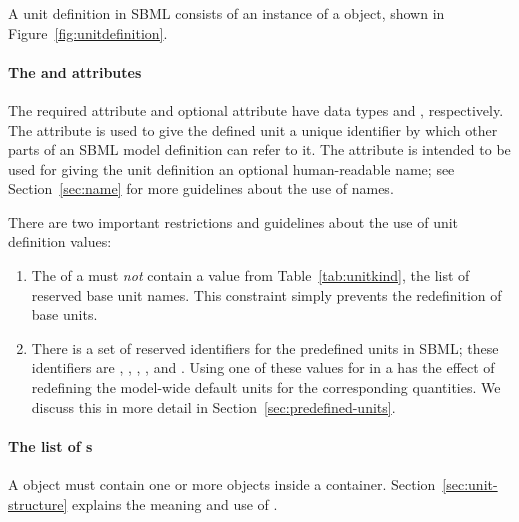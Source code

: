 \subsubsection{}
\label{sec:unitdefinition-structure}

A unit definition in SBML consists of an instance of a
\UnitDefinition object, shown in Figure~\ref{fig:unitdefinition}.


\paragraph{The  and  attributes}

The required attribute  and optional attribute  have
data types  and , respectively.
The  attribute is used to give the defined unit a unique
identifier by which other parts of an SBML model definition can
refer to it.  The  attribute is intended to be used for
giving the unit definition an optional human-readable name; see
Section~\ref{sec:name} for more guidelines about the use of names.

There are two important restrictions and guidelines about the use
of unit definition  values:
\begin{enumerate}
  
\item The  of a \UnitDefinition must \emph{not} contain
  a value from Table~\ref{tab:unitkind}, the list of
    reserved base unit names.  This constraint simply prevents
  the redefinition of base units.

\item There is a set of reserved identifiers for the
  predefined units in SBML; these identifiers are ,
  , , , and .  Using
  one of these values for  in a \UnitDefinition has the
  effect of redefining the model-wide default units for the
  corresponding quantities.  We discuss this in more detail in
  Section~\ref{sec:predefined-units}.

\end{enumerate}


\paragraph{The list of s}
\label{sec:listofunits}

A \UnitDefinition object must contain one or more \Unit objects
inside a \ListOfUnits container.
Section~\ref{sec:unit-structure} explains the meaning and use of
\Unit.


